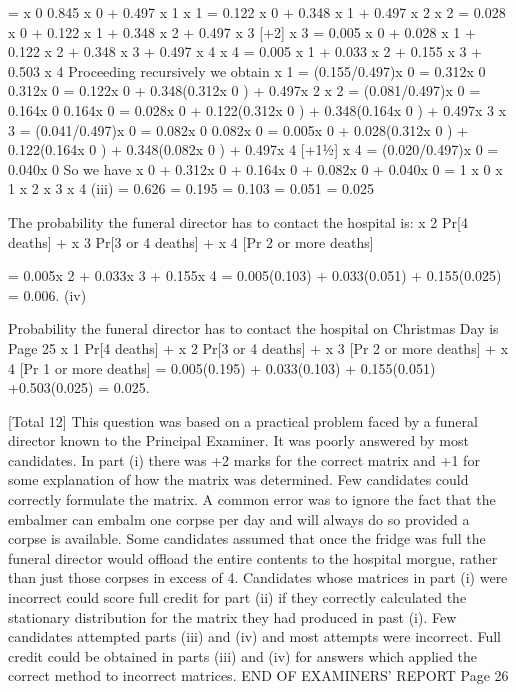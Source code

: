 \documentclass[a4paper,12pt]{article}
\begin{document}
=
x 0 0.845 x 0 + 0.497 x 1
x 1 = 0.122 x 0 + 0.348 x 1 + 0.497 x 2
x 2 = 0.028 x 0 + 0.122 x 1 + 0.348 x 2 + 0.497 x 3
[+2]
x 3 = 0.005 x 0 + 0.028 x 1 + 0.122 x 2 + 0.348 x 3 + 0.497 x 4
x 4 = 0.005 x 1 + 0.033 x 2 + 0.155 x 3 + 0.503 x 4
Proceeding recursively we obtain
x 1 = (0.155/0.497)x 0 = 0.312x 0
0.312x 0 = 0.122x 0 + 0.348(0.312x 0 ) + 0.497x 2
x 2 = (0.081/0.497)x 0 = 0.164x 0
0.164x 0 = 0.028x 0 + 0.122(0.312x 0 ) + 0.348(0.164x 0 ) + 0.497x 3
x 3 = (0.041/0.497)x 0 = 0.082x 0
0.082x 0 = 0.005x 0 + 0.028(0.312x 0 ) + 0.122(0.164x 0 ) + 0.348(0.082x 0 )
+ 0.497x 4
[+11⁄2]
x 4 = (0.020/0.497)x 0 = 0.040x 0
So we have
x 0 + 0.312x 0 + 0.164x 0 + 0.082x 0 + 0.040x 0 = 1
x 0
x 1
x 2
x 3
x 4
(iii)
= 0.626
= 0.195
= 0.103
= 0.051
= 0.025



The probability the funeral director has to contact the hospital is:
x 2 Pr[4 deaths] + x 3 Pr[3 or 4 deaths] + x 4 [Pr 2 or more deaths]

= 0.005x 2 + 0.033x 3 + 0.155x 4
= 0.005(0.103) + 0.033(0.051) + 0.155(0.025) = 0.006.
(iv)


Probability the funeral director has to contact the
hospital on Christmas Day is
Page 25
x 1 Pr[4 deaths] + x 2 Pr[3 or 4 deaths] + x 3 [Pr 2 or more deaths]
+ x 4 [Pr 1 or more deaths] 
= 0.005(0.195) + 0.033(0.103) + 0.155(0.051) +0.503(0.025) = 0.025. 

[Total 12]
This question was based on a practical problem faced by a funeral
director known to the Principal Examiner. It was poorly answered by
most candidates. In part (i) there was +2 marks for the correct matrix and
+1 for some explanation of how the matrix was determined. Few
candidates could correctly formulate the matrix. A common error was to
ignore the fact that the embalmer can embalm one corpse per day and will
always do so provided a corpse is available. Some candidates assumed
that once the fridge was full the funeral director would offload the entire contents to the hospital morgue, rather than just those corpses in excess of
4. Candidates whose matrices in part (i) were incorrect could score full
credit for part (ii) if they correctly calculated the stationary distribution
for the matrix they had produced in past (i). Few candidates attempted
parts (iii) and (iv) and most attempts were incorrect. Full credit could be
obtained in parts (iii) and (iv) for answers which applied the correct
method to incorrect matrices.
END OF EXAMINERS’ REPORT
Page 26
\end{document}

